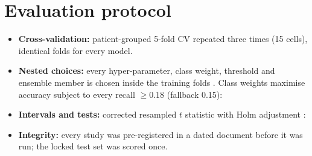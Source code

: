 \section{Evaluation protocol}\label{sec:3.6}

\begin{itemize}
  \item \textbf{Cross-validation:} patient-grouped 5-fold CV repeated three times (15 cells), identical folds for every model.
  \item \textbf{Nested choices:} every hyper-parameter, class weight, threshold and ensemble member is chosen inside the training folds \cite{ref37}. Class weights maximise accuracy subject to every recall $\ge0.18$ (fallback 0.15):
\EqThreeThree
  \item \textbf{Intervals and tests:} corrected resampled $t$ statistic \cite{ref38} with Holm adjustment \cite{ref39}:
\EqThreeFour
  \item \textbf{Integrity:} every study was pre-registered in a dated document before it was run; the locked test set was scored once.
\end{itemize}
